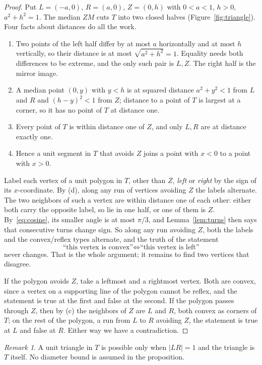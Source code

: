 \documentclass[11pt]{article}
\theoremstyle{remark}
\newtheorem*{remark}{Remark}
\begin{document}
\begin{proof}
Put $L=(-a,0)$, $R=(a,0)$, $Z=(0,h)$ with $0<a<1$, $h>0$, $a^2+h^2=1$. The median
$ZM$ cuts $T$ into two closed halves (Figure~\ref{fig:triangle}). Four facts about
distances do all the work.
\begin{enumerate}
\item[(a)] Two points of the left half differ by at most $a$ horizontally and at most $h$
vertically, so their distance is at most $\sqrt{a^2+h^2}=1$. Equality needs both
differences to be extreme, and the only such pair is $L,Z$. The right half is the mirror
image.
\item[(b)] A median point $(0,y)$ with $y<h$ is at squared distance $a^2+y^2<1$ from $L$
and $R$ and $(h-y)^2<1$ from $Z$; distance to a point of $T$ is largest at a corner, so it
has no point of $T$ at distance one.
\item[(c)] Every point of $T$ is within distance one of $Z$, and only $L,R$ are at distance
exactly one.
\item[(d)] Hence a unit segment in $T$ that avoids $Z$ joins a point with $x<0$ to a point
with $x>0$.
\end{enumerate}
Label each vertex of a unit polygon in $T$, other than $Z$, \emph{left} or \emph{right}
by the sign of its $x$-coordinate. By (d), along any run of vertices avoiding $Z$ the
labels alternate. The two neighbors of such a vertex are within distance one of each
other: either both carry the opposite label, so lie in one half, or one of them is $Z$.
By~\eqref{eq:cosine}, its smaller angle is at most $\pi/3$, and Lemma~\ref{lem:turns} then
says that consecutive turns change sign. So along any run avoiding $Z$, both the labels
and the convex/reflex types alternate, and the truth of the statement
\[
  \text{``this vertex is convex''}\iff\text{``this vertex is left''}
\]
never changes. That is the whole argument; it remains to find two vertices that disagree.

If the polygon avoids $Z$, take a leftmost and a rightmost vertex. Both are convex, since
a vertex on a supporting line of the polygon cannot be reflex, and the statement is true
at the first and false at the second. If the polygon passes through $Z$, then by (c) the
neighbors of $Z$ are $L$ and $R$, both convex as corners of $T$; on the rest of the
polygon, a run from $L$ to $R$ avoiding $Z$, the statement is true at $L$ and false at
$R$. Either way we have a contradiction.
\end{proof}

\begin{remark}
A unit triangle in $T$ is possible only when $|LR|=1$ and the triangle is $T$ itself. No
diameter bound is assumed in the proposition.
\end{remark}
\end{document}
